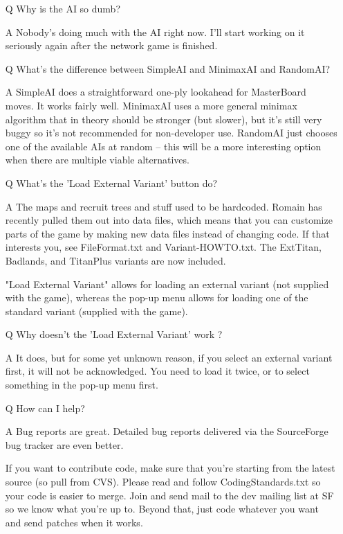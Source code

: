 \documentclass{article}
\begin{document}
\begin{itemize}
\item[Q] Why is the AI so dumb?

\item[A] Nobody's doing much with the AI right now. I'll start working
 on it seriously again after the network game is finished.


\item[Q] What's the difference between SimpleAI and MinimaxAI and RandomAI?

\item[A] SimpleAI does a straightforward one-ply lookahead for MasterBoard
 moves. It works fairly well. MinimaxAI uses a more general minimax 
 algorithm that in theory should be stronger (but slower), but it's 
 still very buggy so it's not recommended for non-developer use. 
 RandomAI just chooses one of the available AIs at random -- this 
 will be a more interesting option when there are multiple viable 
 alternatives.


\item[Q] What's the 'Load External Variant' button do? 

\item[A] The maps and recruit trees and stuff used to be hardcoded. Romain
 has recently pulled them out into data files, which means that you
 can customize parts of the game by making new data files instead of
 changing code. If that interests you, see FileFormat.txt and
 Variant-HOWTO.txt. The ExtTitan, Badlands, and TitanPlus variants 
 are now included.

 "Load External Variant" allows for loading an external variant
 (not supplied with the game), whereas the pop-up menu allows
 for loading one of the standard variant (supplied with the game).


\item[Q] Why doesn't the 'Load External Variant' work ?

\item[A] It does, but for some yet unknown reason, if you select an external
 variant first, it will not be acknowledged. You need to load it
 twice, or to select something in the pop-up menu first.


\item[Q] How can I help?

\item[A] Bug reports are great. Detailed bug reports delivered via the 
 SourceForge bug tracker are even better. 
 
 If you want to contribute code, make sure that you're starting 
 from the latest source (so pull from CVS). Please read and follow
 CodingStandards.txt so your code is easier to merge. Join and
 send mail to the dev mailing list at SF so we know what you're
 up to. Beyond that, just code whatever you want and send 
 patches when it works.

\end{itemize}
\end{document}
